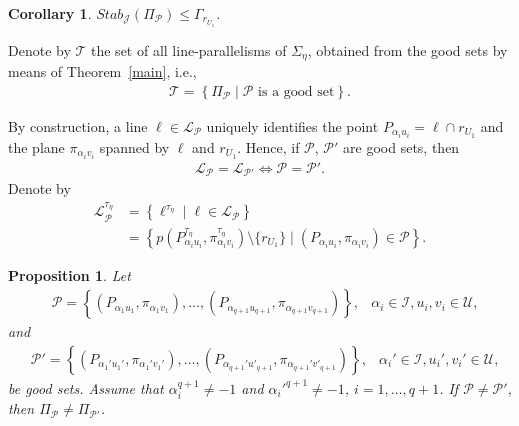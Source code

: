 \documentclass[11pt]{article}
\newtheorem{prop}[theorem]{Proposition}
\newtheorem{cor}[theorem]{Corollary}
\theoremstyle{definition}
\numberwithin{equation}{section}
\def\cI{\mathcal I}
\def\cJ{\mathcal J}
\def\cL{\mathcal L}
\def\cP{\mathcal P}
\def\cU{\mathcal U}
\def\cT{\mathcal T}
\begin{document}
\begin{cor}
    $Stab_{\cJ}(\Pi_{\cP}) \le \Gamma_{r_{U_1}}$.
\end{cor}

Denote by $\cT$ the set of all line-parallelisms of $\Sigma_{\eta}$, obtained from the good sets by means of Theorem~\ref{main}, i.e.,
\begin{align*}
    \cT = \left\{ \Pi_{\cP} \mid \cP \mbox{ is a good set}\right\}.
\end{align*}



By construction, a line $\ell \in \cL_{\cP}$ uniquely identifies the point $P_{\alpha_iu_i} = \ell \cap r_{U_1}$ and the plane $\pi_{\alpha_iv_i}$ spanned by $\ell$ and $r_{U_1}$. Hence, if $\cP$, $\cP'$ are good sets, then 
\begin{align*}
    \cL_{\cP} = \cL_{\cP'} \iff \cP = \cP'.
\end{align*}
Denote by 
\begin{align*}  \cL_{\cP}^{\tau_{\eta}} & = \left\{ \ell^{\tau_{\eta}} \mid \ell \in \cL_{\cP} \right\} \\
    & = \left\{p\left(P_{\alpha_iu_i}^{\tau_{\eta}}, \pi_{\alpha_iv_i}^{\tau_{\eta}}\right) \setminus \{r_{U_1}\} \mid \left(P_{\alpha_iu_i}, \pi_{\alpha_iv_i}\right) \in \cP \right\}. 
\end{align*}
\begin{prop}\label{distinctgoodsets}
Let \begin{align*}
& \cP = \left\{\left(P_{\alpha_{1} u_1}, \pi_{\alpha_{1} v_1}\right), \dots, \left(P_{\alpha_{{q+1}} u_{q+1}}, \pi_{\alpha_{{q+1}} v_{q+1}}\right)\right\}, & \alpha_{i} \in \cI, u_i, v_i \in \cU, 
\end{align*}
and 
\begin{align*}
& \cP' = \left\{\left(P_{\alpha_{1}' u_1'}, \pi_{\alpha_{1}' v_1'}\right), \dots, \left(P_{\alpha_{q+1}' u'_{q+1}}, \pi_{\alpha_{q+1}' v'_{q+1}}\right)\right\}, & \alpha_{i}' \in \cI, u_i', v_i' \in \cU, 
\end{align*}
be good sets. Assume that $\alpha_i^{q+1}\neq -1$ and $\alpha_i'^{q+1}\neq -1$, $i = 1, \dots, q+1$. If $\cP \ne \cP'$, then $\Pi_{\cP} \ne \Pi_{\cP'}$.
\end{prop}
\end{document}
